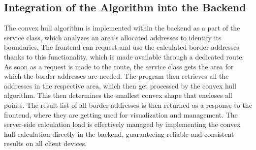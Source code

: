     \subsection{Integration of the Algorithm into the Backend}
    The convex hull algorithm is implemented within the backend as a part of the service class, which analyzes an area's allocated addresses to identify its boundaries. The frontend can request and use the calculated border addresses thanks to this functionality, which is made available through a dedicated route. \newline
    As soon as a request is made to the route, the service class gets the area for which the border addresses are needed. The program then retrieves all the addresses in the respective area, which then get processed by the convex hull algorithm. This then determines the smallest convex shape that encloses all points. The result list of all border addresses is then returned as a response to the frontend, where they are getting used for visualization and management. \newline
    The server-side calculation load is effectively managed by implementing the convex hull calculation directly in the backend, guaranteeing reliable and consistent results on all client devices.

    \newpage